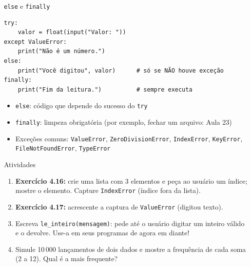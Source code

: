 \documentclass[aspectratio=169,10pt,t]{beamer}
\begin{document}
\begin{frame}[fragile]{\texttt{else} e \texttt{finally}}
\begin{lstlisting}
try:
    valor = float(input("Valor: "))
except ValueError:
    print("Não é um número.")
else:
    print("Você digitou", valor)      # só se NÃO houve exceção
finally:
    print("Fim da leitura.")          # sempre executa
\end{lstlisting}
  \begin{itemize}
    \item \texttt{else}: código que depende do sucesso do \texttt{try}
    \item \texttt{finally}: limpeza obrigatória (por exemplo, \alert{fechar um arquivo}: Aula 23)
    \item Exceções comuns: \texttt{ValueError}, \texttt{ZeroDivisionError}, \texttt{IndexError}, \texttt{KeyError}, \texttt{FileNotFoundError}, \texttt{TypeError}
  \end{itemize}
\end{frame}

\begin{frame}{Atividades}
  \begin{enumerate}
    \item \textbf{Exercício 4.16:} crie uma lista com 3 elementos e peça ao usuário um índice; mostre o elemento. Capture \texttt{IndexError} (índice fora da lista).
    \item \textbf{Exercício 4.17:} acrescente a captura de \texttt{ValueError} (digitou texto).
    \item Escreva \texttt{le\_inteiro(mensagem)}: pede até o usuário digitar um inteiro válido e o devolve. Use-a em seus programas de agora em diante!
    \item Simule 10\,000 lançamentos de dois dados e mostre a frequência de cada soma (2 a 12). Qual é a mais frequente?
  \end{enumerate}
\end{frame}


\end{document}
